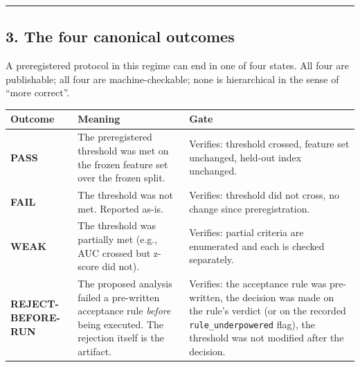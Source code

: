 \documentclass[
]{article}
\newcounter{none} %
\begin{document}
\begin{center}\rule{0.5\linewidth}{0.5pt}\end{center}

\subsection{3. The four canonical
outcomes}\label{the-four-canonical-outcomes}

A preregistered protocol in this regime can end in one of four states.
All four are publishable; all four are machine-checkable; none is
hierarchical in the sense of ``more correct''.

{\def\LTcaptype{none} %
\begin{longtable}[]{@{}
  >{\raggedright\arraybackslash}p{}
  >{\raggedright\arraybackslash}p{}
  >{\raggedright\arraybackslash}p{}@{}}
\toprule\noalign{}
\begin{minipage}[b]{\linewidth}\raggedright
Outcome
\end{minipage} & \begin{minipage}[b]{\linewidth}\raggedright
Meaning
\end{minipage} & \begin{minipage}[b]{\linewidth}\raggedright
Gate
\end{minipage} \\
\midrule\noalign{}
\endhead
\bottomrule\noalign{}
\endlastfoot
\textbf{PASS} & The preregistered threshold was met on the frozen
feature set over the frozen split. & Verifies: threshold crossed,
feature set unchanged, held-out index unchanged. \\
\textbf{FAIL} & The threshold was not met. Reported as-is. & Verifies:
threshold did not cross, no change since preregistration. \\
\textbf{WEAK} & The threshold was partially met (e.g., AUC crossed but
z-score did not). & Verifies: partial criteria are enumerated and each
is checked separately. \\
\textbf{REJECT-BEFORE-RUN} & The proposed analysis failed a pre-written
acceptance rule \emph{before} being executed. The rejection itself is
the artifact. & Verifies: the acceptance rule was pre-written, the
decision was made on the rule's verdict (or on the recorded
\texttt{rule\_underpowered} flag), the threshold was not modified after
the decision. \\
\end{longtable}
}
\end{document}
